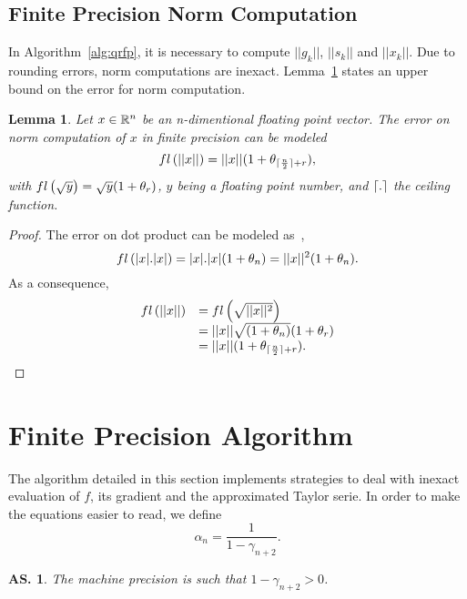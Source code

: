 \documentclass{article}[12pt]
\DeclarePairedDelimiter{\ceil}{\lceil}{\rceil}
\newtheorem{lemma}[]{Lemma}
\newtheorem{assumption}[]{\textbf{AS.}}
\begin{document}
	\subsection{Finite Precision Norm Computation}
		In Algorithm~\ref{alg:qrfp}, it is necessary to compute $||g_k||$,  $||s_k||$ and $||x_k||$. Due to rounding errors, norm computations are inexact. Lemma~\ref{lem:norm_inexact} states an upper bound on the error for norm computation.
		\begin{lemma}
			\label{lem:norm_inexact}
			Let $x\in\mathbb{R}^n$ be an n-dimentional floating point vector. The error on norm computation of $x$ in finite precision can be modeled
			\begin{equation}
				\fl{||x||} = ||x||(1+\theta_{\ceil{\frac{n}{2}}+r}),
			\end{equation}
		with $fl\left(\sqrt{y}\right) = \sqrt{y}(1+\theta_r)$, $y$ being a floating point number, and $\ceil{.}$ the ceiling function.
		\end{lemma}
		\begin{proof}
			The error on dot product can be modeled as~\cite{higham2002accuracy},
			\begin{equation}
				fl\left(|x|.|x|\right) = |x|.|x|(1+\theta_n) = ||x||^2(1+\theta_n).
			\end{equation}
			As a consequence,
			\begin{equation}
				\begin{array}{ll}
					\fl{||x||} & = \fl{\sqrt{||x||^2}}\\
					 & = ||x||\sqrt{(1+\theta_n)}(1+\theta_r)\\
					 & = ||x||(1+\theta_{\ceil{\frac{n}{2}}+r}).
				\end{array}
			\end{equation}
		\end{proof}
		
	\section{Finite Precision Algorithm}
	The algorithm detailed in this section implements strategies to deal with inexact evaluation of $f$, its gradient and the approximated Taylor serie. In order to make the equations easier to read, we define
	\begin{equation}
		\alpha_n = \dfrac{1}{1-\gamma_{n+2}}.
	\end{equation} 
	\begin{assumption}
		The machine precision is such that $1-\gamma_{n+2}>0$.
	\end{assumption}
	
\end{document}
